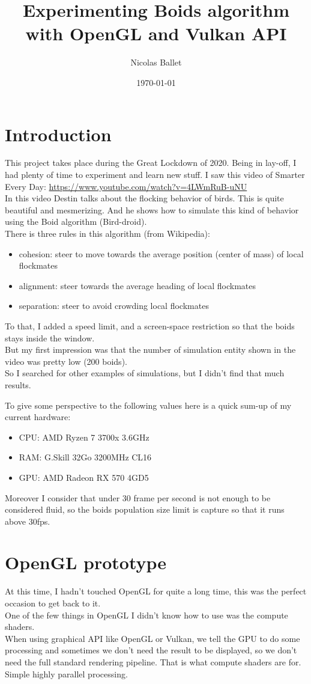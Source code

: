 \documentclass{article}
\title{Experimenting Boids algorithm with OpenGL and Vulkan API}
\author{Nicolas Ballet}
\date{\today}
\begin{document}
\maketitle
\tableofcontents
\newpage
\section{Introduction}
This project takes place during the Great Lockdown of 2020. Being in lay-off, I had plenty of time to experiment and learn new stuff.
I saw this video of Smarter Every Day: \url{https://www.youtube.com/watch?v=4LWmRuB-uNU}\\
In this video Destin talks about the flocking behavior of birds. This is quite beautiful and mesmerizing. And he shows how to simulate this kind of behavior using the Boid algorithm (Bird-droid).\\
There is three rules in this algorithm (from Wikipedia):
\begin{itemize}
    \item cohesion: steer to move towards the average position (center of mass) of local flockmates
    \item alignment: steer towards the average heading of local flockmates
    \item separation: steer to avoid crowding local flockmates
\end{itemize}
To that, I added a speed limit, and a screen-space restriction so that the boids stays inside the window.\\

But my first impression was that the number of simulation entity shown in the video was pretty low (200 boids).\\
So I searched for other examples of simulations, but I didn't find that much results.

To give some perspective to the following values here is a quick sum-up of my current hardware:
\begin{itemize}
    \item CPU: AMD Ryzen 7 3700x 3.6GHz
    \item RAM: G.Skill 32Go 3200MHz CL16
    \item GPU: AMD Radeon RX 570 4GD5
\end{itemize}
Moreover I consider that under 30 frame per second is not enough to be considered fluid, so the boids population size limit is capture so that it runs above 30fps.

\section{OpenGL prototype}
At this time, I hadn't touched OpenGL for quite a long time, this was the perfect occasion to get back to it.\\
One of the few things in OpenGL I didn't know how to use was the compute shaders.\\
When using graphical API like OpenGL or Vulkan, we tell the GPU to do some processing and sometimes we don't need the result to be displayed, so we don't need the full standard rendering pipeline. That is what compute shaders are for. Simple highly parallel processing.\\
\end{document}

